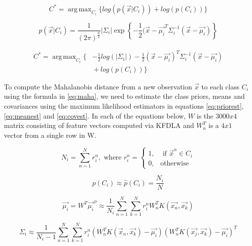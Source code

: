\documentclass[journal]{IEEEtran}
\DeclareMathOperator*{\argmax}{arg\,max}
\begin{document}
\begin{equation}
\label{eq:jointprob}
C^* = \argmax_{C_i}\{log(p(\vec{x}|C_i)) + log(p(C_i))\}
\end{equation}

\begin{equation}
\label{eq:assumegauss}
p(\vec{x}|C_i) = \frac{1}{(2\pi)^{\frac{d}{2}}} \left| \Sigma_i \right|\exp{\left\{-\frac{1}{2}(\vec{x}-\vec{\mu_i}^T\Sigma_i^{-1}(\vec{x}-\vec{\mu_i})\right\}}
\end{equation}

\begin{align}
C^* = \argmax_{C_i}\{ &-\frac{1}{2} log(\left|\Sigma_i\right|) - \frac{1}{2}(\vec{x} - \vec{\mu_i})^T\Sigma_i^{-1}(\vec{x}-\vec{\mu_i}) \label{eq:maha} \\
& {} + log(p(C_i)) \nonumber \}
\end{align}

\par To compute the Mahalanobis distance from a new observation \(\vec{x}\) to each class \(C_i\) using the formula in \ref{eq:maha}, we need to estimate the class priors, means and covariances using the maximum likelihood estimators in equations \ref{eq:priorest}, \ref{eq:meanest} and \ref{eq:covest}. In each of the equations below, \(W\) is the \(3000x4\) matrix consisting of feature vectors computed via KFDLA and \(W_n^T\) is a \(4x1\) vector from a single row in W.

\begin{equation}
\label{eq:indicator}
N_i = \sum_{n=1}^{N}{r_i^n}, \text{    where     }  r_i^n =
\begin{cases}
 1 ,& \text{    if    } \vec{x}^n \in C_i \\
 0         ,& \text{otherwise}
\end{cases}
\end{equation}

\begin{equation}
\label{eq:priorest}
p(C_i) \approx \hat{p}(C_i) = \frac{N_i}{N}
\end{equation}

\begin{equation}
\label{eq:meanest}
\vec{\mu_i} = W^T\vec{\mu_i}^\phi \approx \frac{1}{N_i}\sum_{n=1}^{N} \sum_{k=1}^{N}r_i^nW_n^TK(\vec{x_n},\vec{x_k})
\end{equation}

\begin{equation}
\label{eq:covest}
\Sigma_i \approx \frac{1}{N_i-1}\sum_{n=1}^{N}\sum_{k=1}^{N}r_i^n(W_n^TK(\vec{x}_n,\vec{x_k}) - \vec{\mu_i})(W_n^TK(\vec{x_j},\vec{x_k})-\vec{\mu_i})^T
\end{equation}
\end{document}
